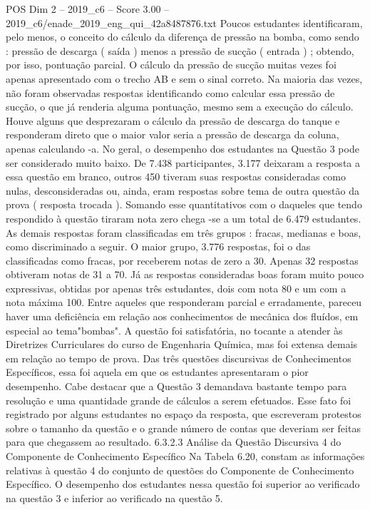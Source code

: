\begin{textsample}{POS Dim 2 – 2019\_c6 – Score 3.00 – 2019\_c6/enade\_2019\_eng\_qui\_42a8487876.txt}
Poucos estudantes identificaram, pelo menos, o conceito do cálculo da diferença de pressão na bomba, como sendo : pressão de descarga ( saída ) menos a pressão de sucção ( entrada ) ; obtendo, por isso, pontuação parcial.
O cálculo da pressão de sucção muitas vezes foi apenas apresentado com o trecho AB e sem o sinal correto.
Na maioria das vezes, não foram observadas respostas identificando como calcular essa pressão de sucção, o que já renderia alguma pontuação, mesmo sem a execução do cálculo.
Houve alguns que desprezaram o cálculo da pressão de descarga do tanque e responderam direto que o maior valor seria a pressão de descarga da coluna, apenas calculando -a.
No geral, o desempenho dos estudantes na Questão 3 pode ser considerado muito baixo.
De 7.438 participantes, 3.177 deixaram a resposta a essa questão em branco, outros 450 tiveram suas respostas consideradas como nulas, desconsideradas ou, ainda, eram respostas sobre tema de outra questão da prova ( resposta trocada ).
Somando esse quantitativos com o daqueles que tendo respondido à questão tiraram nota zero chega -se a um total de 6.479 estudantes.
As demais respostas foram classificadas em três grupos : fracas, medianas e boas, como discriminado a seguir.
O maior grupo, 3.776 respostas, foi o das classificadas como fracas, por receberem notas de zero a 30.
Apenas 32 respostas obtiveram notas de 31 a 70.
Já as respostas consideradas boas foram muito pouco expressivas, obtidas por apenas três estudantes, dois com nota 80 e um com a nota máxima 100.
Entre aqueles que responderam parcial e erradamente, pareceu haver uma deficiência em relação aos conhecimentos de mecânica dos fluídos, em especial ao tema"bombas".
A questão foi satisfatória, no tocante a atender às Diretrizes Curriculares do curso de Engenharia Química, mas foi extensa demais em relação ao tempo de prova.
Das três questões discursivas de Conhecimentos Específicos, essa foi aquela em que os estudantes apresentaram o pior desempenho.
Cabe destacar que a Questão 3 demandava bastante tempo para resolução e uma quantidade grande de cálculos a serem efetuados.
Esse fato foi registrado por alguns estudantes no espaço da resposta, que escreveram protestos sobre o tamanho da questão e o grande número de contas que deveriam ser feitas para que chegassem ao resultado. 6.3.2.3 Análise da Questão Discursiva 4 do Componente de Conhecimento Específico Na Tabela 6.20, constam as informações relativas à questão 4 do conjunto de questões do Componente de Conhecimento Específico.
O desempenho dos estudantes nessa questão foi superior ao verificado na questão 3 e inferior ao verificado na questão 5.

\end{textsample}
